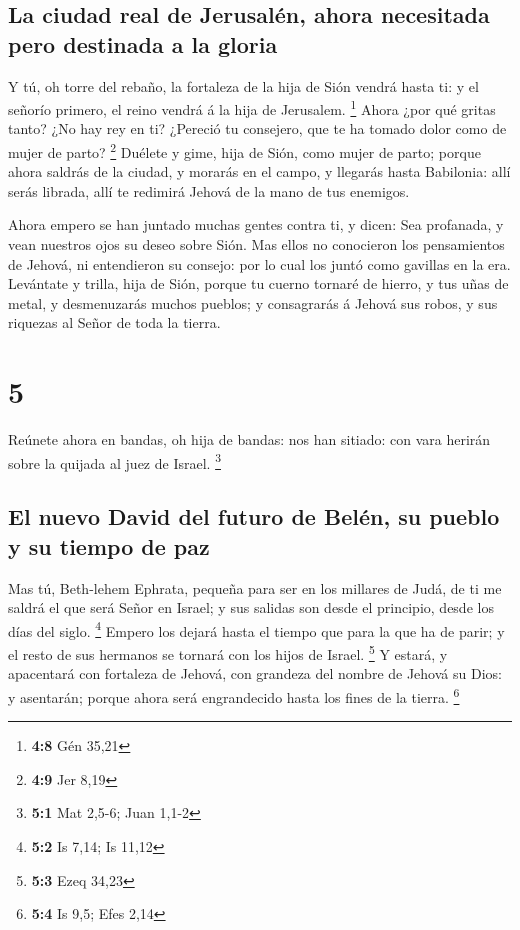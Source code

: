 \hypertarget{la-ciudad-real-de-jerusaluxe9n-ahora-necesitada-pero-destinada-a-la-gloria}{%
\subsection{La ciudad real de Jerusalén, ahora necesitada pero destinada
a la
gloria}\label{la-ciudad-real-de-jerusaluxe9n-ahora-necesitada-pero-destinada-a-la-gloria}}

 Y tú, oh torre del rebaño, la fortaleza de la hija de Sión
vendrá hasta ti: y el señorío primero, el reino vendrá á la hija de
Jerusalem. \footnote{\textbf{4:8} Gén 35,21}  Ahora ¿por qué
gritas tanto? ¿No hay rey en ti? ¿Pereció tu consejero, que te ha tomado
dolor como de mujer de parto? \footnote{\textbf{4:9} Jer 8,19}
 Duélete y gime, hija de Sión, como mujer de parto; porque
ahora saldrás de la ciudad, y morarás en el campo, y llegarás hasta
Babilonia: allí serás librada, allí te redimirá Jehová de la mano de tus
enemigos.

 Ahora empero se han juntado muchas gentes contra ti, y
dicen: Sea profanada, y vean nuestros ojos su deseo sobre Sión.
 Mas ellos no conocieron los pensamientos de Jehová, ni
entendieron su consejo: por lo cual los juntó como gavillas en la era.
 Levántate y trilla, hija de Sión, porque tu cuerno tornaré
de hierro, y tus uñas de metal, y desmenuzarás muchos pueblos; y
consagrarás á Jehová sus robos, y sus riquezas al Señor de toda la
tierra.

\hypertarget{section-4}{%
\section{5}\label{section-4}}

 Reúnete ahora en bandas, oh hija de bandas: nos han
sitiado: con vara herirán sobre la quijada al juez de Israel.
\footnote{\textbf{5:1} Mat 2,5-6; Juan 1,1-2}

\hypertarget{el-nuevo-david-del-futuro-de-beluxe9n-su-pueblo-y-su-tiempo-de-paz}{%
\subsection{El nuevo David del futuro de Belén, su pueblo y su tiempo de
paz}\label{el-nuevo-david-del-futuro-de-beluxe9n-su-pueblo-y-su-tiempo-de-paz}}

 Mas tú, Beth-lehem Ephrata, pequeña para ser en los
millares de Judá, de ti me saldrá el que será Señor en Israel; y sus
salidas son desde el principio, desde los días del siglo. \footnote{\textbf{5:2}
  Is 7,14; Is 11,12}  Empero los dejará hasta el tiempo que
para la que ha de parir; y el resto de sus hermanos se tornará con los
hijos de Israel. \footnote{\textbf{5:3} Ezeq 34,23}  Y
estará, y apacentará con fortaleza de Jehová, con grandeza del nombre de
Jehová su Dios: y asentarán; porque ahora será engrandecido hasta los
fines de la tierra. \footnote{\textbf{5:4} Is 9,5; Efes 2,14}


